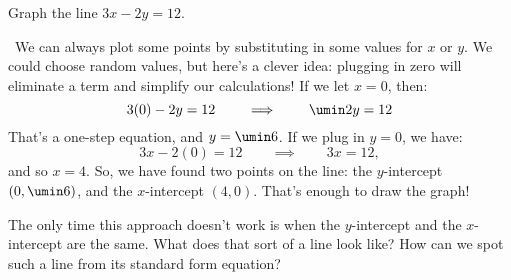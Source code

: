 \begin{boxedex}
Graph the line $3x - 2y = 12$.

\exsoln\ We can always plot some points by substituting in some values for $x$ or $y$. We could choose random values, but here's a clever idea: plugging in zero will eliminate a term and simplify our calculations! If we let $x=0$, then:
\[3(0) - 2y = 12 \qquad\implies\qquad \umin2y=12\]
That's a one-step equation, and $y = \umin6$. If we plug in $y=0$, we have:
\[3x - 2(0) = 12 \qquad\implies\qquad 3x=12,\]
and so $x=4$. So, we have found two points on the line: the $y$-intercept $(0,\umin6)$, and the $x$-intercept $(4,0)$. That's enough to draw the graph!

\begin{center}
\end{center}
%

The only time this approach doesn't work is when the $y$-intercept and the $x$-intercept are the same. What does that sort of a line look like? How can we spot such a line from its standard form equation?
\end{boxedex}

